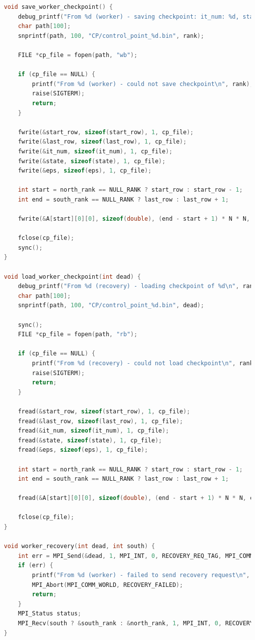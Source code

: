 \documentclass[a4paper]{article}
\begin{document}
\begin{lstlisting}[caption=jac\_3d\_mpi\_ft.c, label={lst:2}, language=C]
void save_worker_checkpoint() {
    debug_printf("From %d (worker) - saving checkpoint: it_num: %d, state: %d\n", rank, it_num, state);
    char path[100];
    snprintf(path, 100, "CP/control_point_%d.bin", rank);

    FILE *cp_file = fopen(path, "wb");

    if (cp_file == NULL) {
        printf("From %d (worker) - could not save checkpoint\n", rank);
        raise(SIGTERM);
        return;
    }

    fwrite(&start_row, sizeof(start_row), 1, cp_file);
    fwrite(&last_row, sizeof(last_row), 1, cp_file);
    fwrite(&it_num, sizeof(it_num), 1, cp_file);
    fwrite(&state, sizeof(state), 1, cp_file);
    fwrite(&eps, sizeof(eps), 1, cp_file);

    int start = north_rank == NULL_RANK ? start_row : start_row - 1;
    int end = south_rank == NULL_RANK ? last_row : last_row + 1;

    fwrite(&A[start][0][0], sizeof(double), (end - start + 1) * N * N, cp_file);

    fclose(cp_file);
    sync();
}

void load_worker_checkpoint(int dead) {
    debug_printf("From %d (recovery) - loading checkpoint of %d\n", rank, dead);
    char path[100];
    snprintf(path, 100, "CP/control_point_%d.bin", dead);

    sync();
    FILE *cp_file = fopen(path, "rb");

    if (cp_file == NULL) {
        printf("From %d (recovery) - could not load checkpoint\n", rank);
        raise(SIGTERM);
        return;
    }

    fread(&start_row, sizeof(start_row), 1, cp_file);
    fread(&last_row, sizeof(last_row), 1, cp_file);
    fread(&it_num, sizeof(it_num), 1, cp_file);
    fread(&state, sizeof(state), 1, cp_file);
    fread(&eps, sizeof(eps), 1, cp_file);

    int start = north_rank == NULL_RANK ? start_row : start_row - 1;
    int end = south_rank == NULL_RANK ? last_row : last_row + 1;

    fread(&A[start][0][0], sizeof(double), (end - start + 1) * N * N, cp_file);

    fclose(cp_file);
}

void worker_recovery(int dead, int south) {
    int err = MPI_Send(&dead, 1, MPI_INT, 0, RECOVERY_REQ_TAG, MPI_COMM_WORLD);
    if (err) {
        printf("From %d (worker) - failed to send recovery request\n", rank);
        MPI_Abort(MPI_COMM_WORLD, RECOVERY_FAILED);
        return;
    }
    MPI_Status status;
    MPI_Recv(south ? &south_rank : &north_rank, 1, MPI_INT, 0, RECOVERY_REQ_TAG, MPI_COMM_WORLD, &status);
}



\end{lstlisting}
\end{document}
